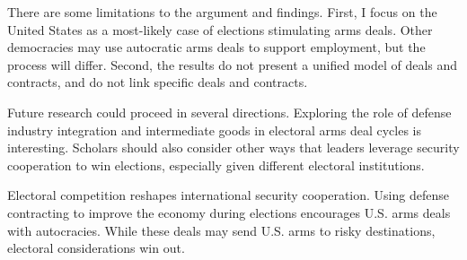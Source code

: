 \documentclass[12pt]{article}
\begin{document}
There are some limitations to the argument and findings.
First, I focus on the United States as a most-likely case of elections stimulating arms deals. 
Other democracies may use autocratic arms deals to support employment, but the process will differ. 
Second, the results do not present a unified model of deals and contracts, and do not link specific deals and contracts. 


Future research could proceed in several directions. 
Exploring the role of defense industry integration and intermediate goods in electoral arms deal cycles is interesting.
Scholars should also consider other ways that leaders leverage security cooperation to win elections, especially given different electoral institutions. 


Electoral competition reshapes international security cooperation.
Using defense contracting to improve the economy during elections encourages U.S. arms deals with autocracies.
While these deals may send U.S. arms to risky destinations, electoral considerations win out. 


 
 
\end{document}
